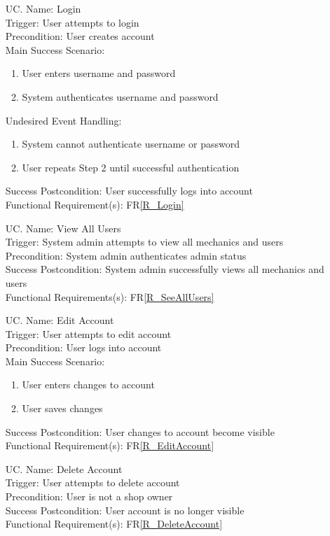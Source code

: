 \documentclass[12pt]{article}
\newcounter{ucnum} %
\begin{document}
\begin{itemize}
\item[UC\refstepcounter{ucnum}\theucnum \label{UC_Login}. ]
Name: Login\\
Trigger: User attempts to login\\
Precondition: User creates account\\
Main Success Scenario:
\begin{enumerate}
    \item User enters username and password
    \item System authenticates username and password
\end{enumerate}
Undesired Event Handling:
\begin{enumerate}
    \item System cannot authenticate username or password
    \item User repeats Step 2 until successful authentication
\end{enumerate}
Success Postcondition: User successfully logs into account\\
Functional Requirement(s): FR\ref{R_Login}

\item[UC\refstepcounter{ucnum}\theucnum \label{UC_ViewAllUsers}. ]
Name: View All Users\\
Trigger: System admin attempts to view all mechanics and users\\
Precondition: System admin authenticates admin status\\
Success Postcondition: System admin successfully views all mechanics and users\\
Functional Requirements(s): FR\ref{R_SeeAllUsers}

\item[UC\refstepcounter{ucnum}\theucnum \label{UC_EditAccount}. ]
Name: Edit Account\\
Trigger: User attempts to edit account\\
Precondition: User logs into account\\
Main Success Scenario:
\begin{enumerate}
    \item User enters changes to account
    \item User saves changes
\end{enumerate}
Success Postcondition: User changes to account become visible\\
Functional Requirement(s): FR\ref{R_EditAccount}

\item[UC\refstepcounter{ucnum}\theucnum \label{UC_DeleteAccount}. ]
Name: Delete Account\\
Trigger: User attempts to delete account\\
Precondition: User is not a shop owner\\
Success Postcondition: User account is no longer visible\\
Functional Requirement(s): FR\ref{R_DeleteAccount}


\end{itemize}
\end{document}
